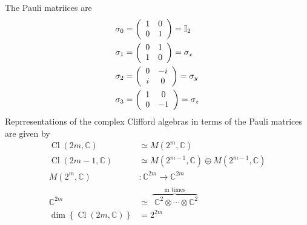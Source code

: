 \documentclass[aps,preprint]{revtex4}%
\begin{document}
The Pauli matriices are
\begin{align}
\mathbb{\sigma}_{0}  &  =\left(
\begin{array}
[c]{cc}%
1 & 0\\
0 & 1
\end{array}
\right)  =\mathbb{I}_{2}\\
\mathbb{\sigma}_{1}  &  =\left(
\begin{array}
[c]{cc}%
0 & 1\\
1 & 0
\end{array}
\right)  =\mathbb{\sigma}_{x}\\
\mathbb{\sigma}_{2}  &  =\left(
\begin{array}
[c]{cc}%
0 & -i\\
i & 0
\end{array}
\right)  =\mathbb{\sigma}_{y}\\
\mathbb{\sigma}_{3}  &  =\left(
\begin{array}
[c]{cc}%
1 & 0\\
0 & -1
\end{array}
\right)  =\mathbb{\sigma}_{z}%
\end{align}
Reprresentations of the complex Clifford algebras in terms of the Pauli
matrices are given by%
\begin{align}
\operatorname*{Cl}\left(  2m,\mathbb{C}\right)   &  \simeq M\left(
2^{m},\mathbb{C}\right) \\
\operatorname*{Cl}\left(  2m-1,\mathbb{C}\right)   &  \simeq M\left(
2^{m-1},\mathbb{C}\right)  \oplus M\left(  2^{m-1},\mathbb{C}\right) \\
M\left(  2^{m},\mathbb{C}\right)   &  :\mathbb{C}^{2m}\rightarrow
\mathbb{C}^{2m}\\
\mathbb{C}^{2m}  &  \simeq\,\overset{\text{m times}}{\overbrace{\,\,\mathbb{C}%
^{2}\otimes\cdots\otimes\mathbb{C}^{2}}}\\
\dim\left\{  \operatorname*{Cl}\left(  2m,\mathbb{C}\right)  \right\}   &
=2^{2m}%
\end{align}
\end{document}
